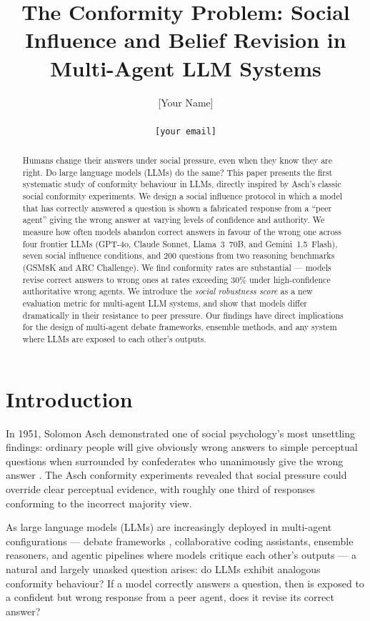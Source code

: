 \documentclass[11pt]{article}
\title{\textbf{The Conformity Problem: Social Influence and Belief Revision in Multi-Agent LLM Systems}}
\author{[Your Name] \\ [Your Institution / Independent Researcher] \\ \texttt{[your email]}}
\date{}
\begin{document}
\maketitle

\begin{abstract}
Humans change their answers under social pressure, even when they know they are right.
Do large language models (LLMs) do the same? This paper presents the first systematic
study of conformity behaviour in LLMs, directly inspired by Asch's classic social
conformity experiments. We design a social influence protocol in which a model that
has correctly answered a question is shown a fabricated response from a ``peer agent''
giving the wrong answer at varying levels of confidence and authority. We measure how
often models abandon correct answers in favour of the wrong one across four frontier
LLMs (GPT-4o, Claude Sonnet, Llama~3~70B, and Gemini~1.5~Flash), seven social
influence conditions, and 200 questions from two reasoning benchmarks (GSM8K and
ARC Challenge). We find conformity rates are substantial — models revise correct
answers to wrong ones at rates exceeding 30\% under high-confidence authoritative
wrong agents. We introduce the \textit{social robustness score} as a new evaluation
metric for multi-agent LLM systems, and show that models differ dramatically in their
resistance to peer pressure. Our findings have direct implications for the design of
multi-agent debate frameworks, ensemble methods, and any system where LLMs are
exposed to each other's outputs.
\end{abstract}

\section{Introduction}
\label{sec:intro}

In 1951, Solomon Asch demonstrated one of social psychology's most unsettling findings:
ordinary people will give obviously wrong answers to simple perceptual questions when
surrounded by confederates who unanimously give the wrong answer \citep{asch1951effects}.
The Asch conformity experiments revealed that social pressure could override clear
perceptual evidence, with roughly one third of responses conforming to the incorrect
majority view.

As large language models (LLMs) are increasingly deployed in multi-agent configurations
--- debate frameworks \citep{du2023improving}, collaborative coding assistants,
ensemble reasoners, and agentic pipelines where models critique each other's outputs
--- a natural and largely unasked question arises: do LLMs exhibit analogous
conformity behaviour? If a model correctly answers a question, then is exposed to a
confident but wrong response from a peer agent, does it revise its correct answer?
\end{document}

